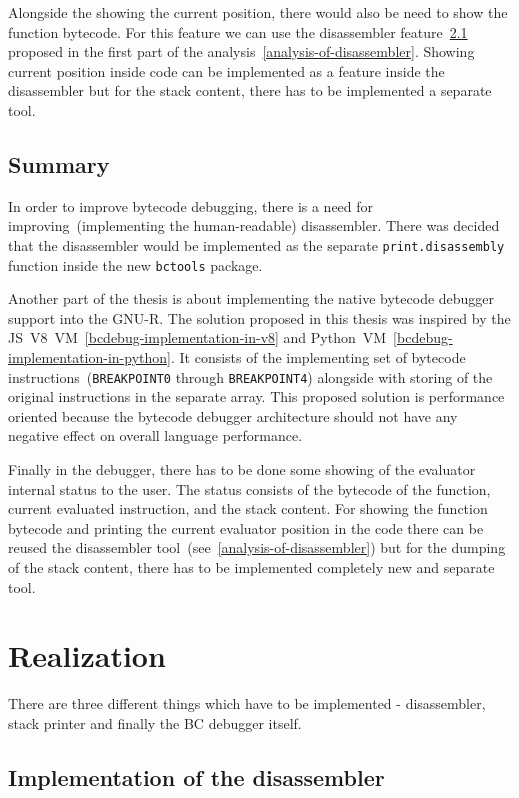 \documentclass[thesis=M,english]{FITthesis}[2018/10/20]
\newcommand{\code}[1]{\texttt{#1}}
\begin{document}
Alongside the showing the current position, there would also be need to show the function bytecode. For this feature we can use the disassembler feature~\ref{implementation-of-disassembler} proposed in the first part of the analysis~\ref{analysis-of-disassembler}. Showing current position inside code can be implemented as a feature inside the disassembler but for the stack content, there has to be implemented a separate tool.

\section{Summary}

In order to improve bytecode debugging, there is a need for improving~(implementing the human-readable) disassembler. There was decided that the disassembler would be implemented as the separate \code{print.disassembly} function inside the new \code{bctools} package.

Another part of the thesis is about implementing the native bytecode debugger support into the GNU-R. The solution proposed in this thesis was inspired by the JS~V8~VM~\ref{bcdebug-implementation-in-v8} and Python~VM~\ref{bcdebug-implementation-in-python}. It consists of the implementing set of bytecode instructions~(\code{BREAKPOINT0} through \code{BREAKPOINT4}) alongside with storing of the original instructions in the separate array. This proposed solution is performance oriented because the bytecode debugger architecture should not have any negative effect on overall language performance.

Finally in the debugger, there has to be done some showing of the evaluator internal status to the user. The status consists of the bytecode of the function, current evaluated instruction, and the stack content. For showing the function bytecode and printing the current evaluator position in the code there can be reused the disassembler tool~(see~\ref{analysis-of-disassembler}) but for the dumping of the stack content, there has to be implemented completely new and separate tool.

\chapter{Realization}\label{realization}

There are three different things which have to be implemented - disassembler, stack printer and finally the BC debugger itself.

\section{Implementation of the disassembler}\label{implementation-of-disassembler}
\end{document}
